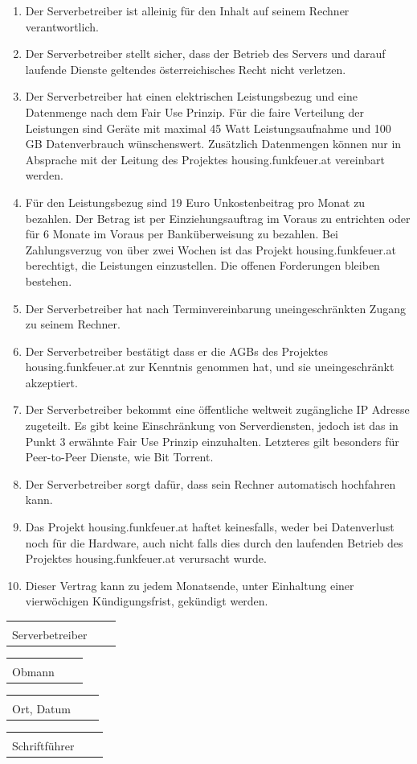 \documentclass[parskip=half]{scrreprt}
\begin{document}
\begin{contract}
   \begin{enumerate}
\item Der Serverbetreiber ist alleinig für den Inhalt auf seinem Rechner verantwortlich.
\item Der Serverbetreiber stellt sicher, dass der Betrieb des Servers und darauf laufende Dienste geltendes österreichisches Recht nicht verletzen.
\item Der Serverbetreiber hat einen elektrischen Leistungsbezug und eine Datenmenge nach dem Fair Use Prinzip. Für die faire Verteilung der Leistungen sind Geräte mit maximal 45 Watt Leistungsaufnahme und 100 GB Datenverbrauch wünschenswert. Zusätzlich Datenmengen können nur in Absprache mit der Leitung des Projektes housing.funkfeuer.at vereinbart werden.
\item Für den Leistungsbezug sind 19 Euro Unkostenbeitrag pro Monat zu bezahlen. Der Betrag ist per Einziehungsauftrag im Voraus zu entrichten oder für 6 Monate im Voraus per Banküberweisung zu bezahlen. Bei Zahlungsverzug von über zwei Wochen ist das Projekt housing.funkfeuer.at berechtigt, die Leistungen einzustellen. Die offenen Forderungen bleiben bestehen.
\item Der Serverbetreiber hat nach Terminvereinbarung uneingeschränkten Zugang zu seinem Rechner.
\item Der Serverbetreiber bestätigt dass er die AGBs des Projektes housing.funkfeuer.at zur Kenntnis genommen hat, und sie uneingeschränkt akzeptiert.
\item Der Serverbetreiber bekommt eine öffentliche weltweit zugängliche IP Adresse zugeteilt. Es gibt keine Einschränkung von Serverdiensten, jedoch ist das in Punkt 3 erwähnte Fair Use Prinzip einzuhalten. Letzteres gilt besonders für Peer-to-Peer Dienste, wie Bit Torrent.
\item Der Serverbetreiber sorgt dafür, dass sein Rechner automatisch hochfahren kann.
\item Das Projekt housing.funkfeuer.at haftet keinesfalls, weder bei Datenverlust noch für die Hardware, auch nicht falls dies durch den laufenden Betrieb des Projektes housing.funkfeuer.at verursacht wurde.
\item Dieser Vertrag kann zu jedem Monatsende, unter Einhaltung einer vierwöchigen Kündigungsfrist, gekündigt werden.
\end{enumerate}
\end{contract}

\vspace{0.5 cm}
\begin{tabular}{p{7cm}p{.5cm}l}
\dotfill \\
Serverbetreiber
\end{tabular}
\hfill
\begin{tabular}{p{7cm}p{.5cm}l}
\dotfill \\
Obmann
\end{tabular}

\vspace{0.5cm}
\begin{tabular}{p{7cm}p{.5cm}l}
\dotfill \\
Ort, Datum
\end{tabular}
\hfill
\begin{tabular}{p{7cm}p{.5cm}l}
\dotfill \\
Schriftführer
\end{tabular}


\end{document}
